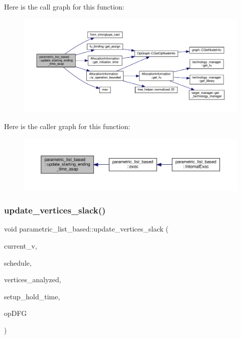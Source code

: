 Here is the call graph for this function\+:
\nopagebreak
\begin{figure}[H]
\begin{center}
\leavevmode
\includegraphics[width=350pt]{d7/d47/classparametric__list__based_a155c333d3654eb3f35cc055b6b97265c_cgraph}
\end{center}
\end{figure}
Here is the caller graph for this function\+:
\nopagebreak
\begin{figure}[H]
\begin{center}
\leavevmode
\includegraphics[width=350pt]{d7/d47/classparametric__list__based_a155c333d3654eb3f35cc055b6b97265c_icgraph}
\end{center}
\end{figure}
\mbox{\label{classparametric__list__based_aa979330060c40188e1c74bbae270ac2b}} 
\subsubsection{\texorpdfstring{update\+\_\+vertices\+\_\+slack()}{update\_vertices\_slack()}}
{\footnotesize\ttfamily void parametric\+\_\+list\+\_\+based\+::update\+\_\+vertices\+\_\+slack (\begin{DoxyParamCaption}\item[{\hyperlink{graph_8hpp_abefdcf0544e601805af44eca032cca14}{vertex}}]{current\+\_\+v,  }\item[{const \hyperlink{schedule_8hpp_af67f402958b3b52a1ec5cc4ce08ae3b9}{Schedule\+Ref}}]{schedule,  }\item[{\hyperlink{classOpVertexSet}{Op\+Vertex\+Set} \&}]{vertices\+\_\+analyzed,  }\item[{double}]{setup\+\_\+hold\+\_\+time,  }\item[{const \hyperlink{op__graph_8hpp_a9a0b240622c47584bee6951a6f5de746}{Op\+Graph\+Const\+Ref}}]{op\+D\+FG }\end{DoxyParamCaption})\hspace{0.3cm}{\ttfamily [private]}}



